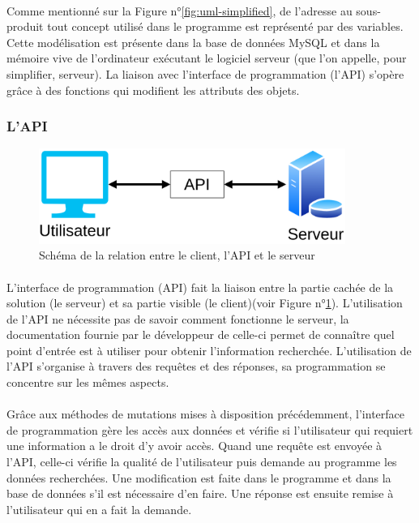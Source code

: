 \documentclass[a4paper, 12pt]{article}
\begin{document}
\paragraph{}Comme mentionné sur la Figure n°\ref{fig:uml-simplified}, de l’adresse au sous-produit tout concept utilisé dans le programme est représenté par des variables.  Cette modélisation est présente dans la base de données MySQL et dans la mémoire vive de l’ordinateur exécutant le logiciel serveur (que l’on appelle, pour simplifier, serveur). La liaison avec l’interface de programmation (l’API) s’opère grâce à des fonctions qui modifient les attributs des objets.

\subsubsection{L'API}

\begin{figure}[H]
	\begin{center}
		\includegraphics[width=10cm]{fig/API_diagram.png}
		\caption{Schéma de la relation entre le client, l'API et le serveur}
		\label{fig:API_diagram}
	\end{center}
\end{figure}

\paragraph{}L’interface de programmation (API) fait la liaison entre la partie cachée de la solution (le serveur) et sa partie visible (le client)(voir Figure n°\ref{fig:API_diagram}). L’utilisation de l’API ne nécessite pas de savoir comment fonctionne le serveur, la documentation fournie par le développeur de celle-ci permet de connaître quel point d’entrée est à utiliser pour obtenir l’information recherchée. L’utilisation de l’API s’organise à travers des requêtes et des réponses, sa programmation se concentre sur les mêmes aspects.
\paragraph{}Grâce aux méthodes de mutations mises à disposition précédemment, l’interface de programmation gère les accès aux données et vérifie si l’utilisateur qui requiert une information a le droit d’y avoir accès. Quand une requête est envoyée à l’API, celle-ci vérifie la qualité de l’utilisateur puis demande au programme les données recherchées. Une modification est faite dans le programme et dans la base de données s’il est nécessaire d’en faire. Une réponse est ensuite remise à l’utilisateur qui en a fait la demande.
\end{document}
